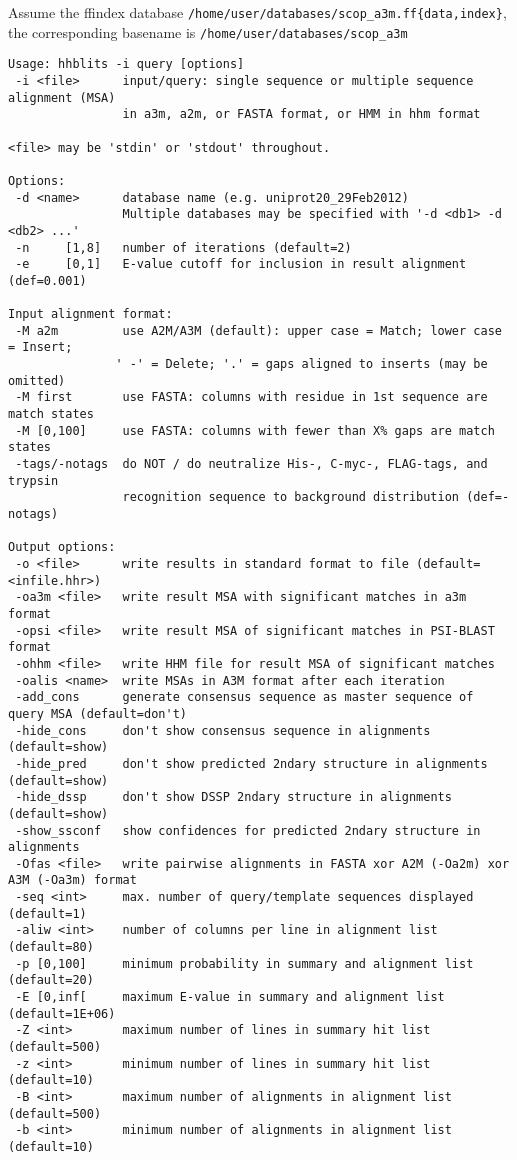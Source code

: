 \documentclass[11pt,a4paper]{article}
\begin{document}
Assume the ffindex database \verb`/home/user/databases/scop_a3m.ff{data,index}`, the corresponding basename
is \verb`/home/user/databases/scop_a3m`

\small 
\begin{verbatim}
Usage: hhblits -i query [options] 
 -i <file>      input/query: single sequence or multiple sequence alignment (MSA)
                in a3m, a2m, or FASTA format, or HMM in hhm format

<file> may be 'stdin' or 'stdout' throughout.

Options:                                                                        
 -d <name>      database name (e.g. uniprot20_29Feb2012)                        
                Multiple databases may be specified with '-d <db1> -d <db2> ...'
 -n     [1,8]   number of iterations (default=2)                               
 -e     [0,1]   E-value cutoff for inclusion in result alignment (def=0.001)       

Input alignment format:                                                       
 -M a2m         use A2M/A3M (default): upper case = Match; lower case = Insert;
               ' -' = Delete; '.' = gaps aligned to inserts (may be omitted)   
 -M first       use FASTA: columns with residue in 1st sequence are match states
 -M [0,100]     use FASTA: columns with fewer than X% gaps are match states   
 -tags/-notags  do NOT / do neutralize His-, C-myc-, FLAG-tags, and trypsin 
                recognition sequence to background distribution (def=-notags)  

Output options: 
 -o <file>      write results in standard format to file (default=<infile.hhr>)
 -oa3m <file>   write result MSA with significant matches in a3m format
 -opsi <file>   write result MSA of significant matches in PSI-BLAST format
 -ohhm <file>   write HHM file for result MSA of significant matches
 -oalis <name>  write MSAs in A3M format after each iteration
 -add_cons      generate consensus sequence as master sequence of query MSA (default=don't)
 -hide_cons     don't show consensus sequence in alignments (default=show)     
 -hide_pred     don't show predicted 2ndary structure in alignments (default=show)
 -hide_dssp     don't show DSSP 2ndary structure in alignments (default=show)  
 -show_ssconf   show confidences for predicted 2ndary structure in alignments
 -Ofas <file>   write pairwise alignments in FASTA xor A2M (-Oa2m) xor A3M (-Oa3m) format   
 -seq <int>     max. number of query/template sequences displayed (default=1)  
 -aliw <int>    number of columns per line in alignment list (default=80)       
 -p [0,100]     minimum probability in summary and alignment list (default=20)  
 -E [0,inf[     maximum E-value in summary and alignment list (default=1E+06)      
 -Z <int>       maximum number of lines in summary hit list (default=500)        
 -z <int>       minimum number of lines in summary hit list (default=10)        
 -B <int>       maximum number of alignments in alignment list (default=500)     
 -b <int>       minimum number of alignments in alignment list (default=10)     


\end{verbatim}
\end{document}
